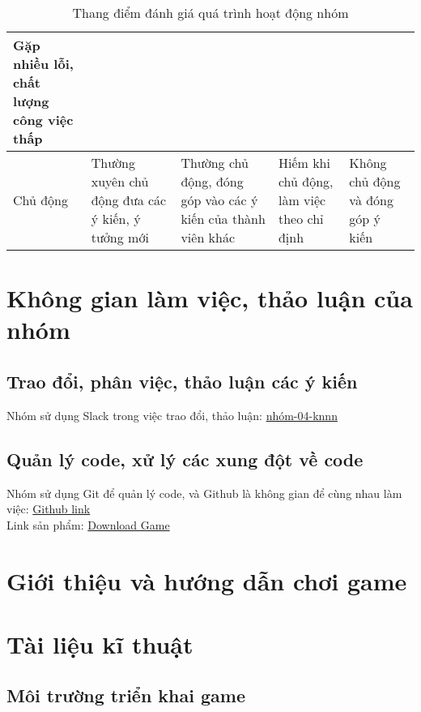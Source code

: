 \documentclass[12pt]{report}
\begin{document}
\begin{table}[H]
{\begin{tabularx}{\textwidth}{|p{60pt}|X|X|X|X|}
            Gặp nhiều lỗi, chất lượng công việc thấp                               \\
            \hline
            Chủ động                                                             &
            Thường xuyên chủ động đưa các ý kiến, ý tưởng mới                    &
            Thường chủ động, đóng góp vào các ý kiến của thành viên khác         &
            Hiếm khi chủ động, làm việc theo chỉ định                            &
            Không chủ động và đóng góp ý kiến                                      \\
            \hline
        \end{tabularx}
    }
    \caption{Thang điểm đánh giá quá trình hoạt động nhóm}
    \label{tab:teamwork_rubric}
\end{table}

\chapter{Không gian làm việc, thảo luận của nhóm}
\label{sec:work_space}

\section{Trao đổi, phân việc, thảo luận các ý kiến}
Nhóm sử dụng Slack trong việc trao đổi, thảo luận: \href{https://ss004e11cn1.slack.com/archives/C07T94K918U}{nhóm-04-knnn}
\section{Quản lý code, xử lý các xung đột về code}
Nhóm sử dụng Git để quản lý code, và Github là không gian để cùng nhau làm việc: \href{https://github.com/ThinhNgo96/snake_game}{Github link} \\
Link sản phẩm: \href{https://github.com/ThinhNgo96/snake_game/releases}{Download Game}

\chapter{Giới thiệu và hướng dẫn chơi game}
\label{sec:game_tutorial}

\chapter{Tài liệu kĩ thuật}
\label{sec:technical_detail}
\section{Môi trường triển khai game}
\end{document}
